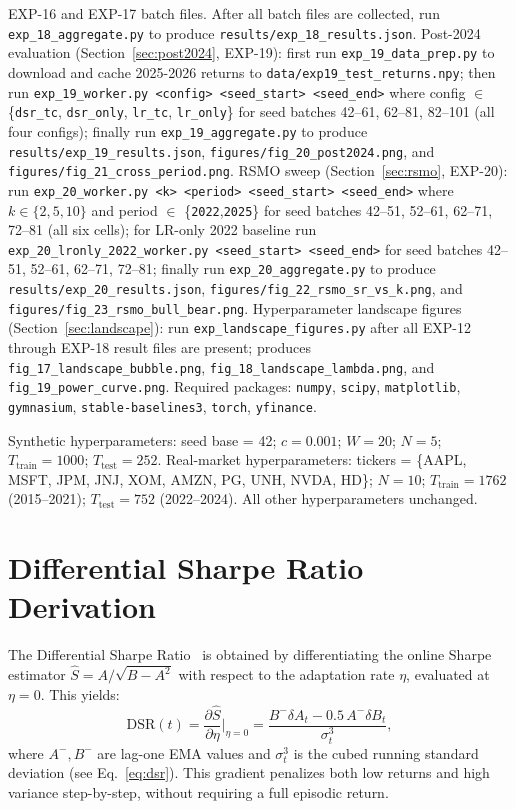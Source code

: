 \documentclass[conference]{IEEEtran}
\begin{document}
EXP-16 and EXP-17 batch files.
After all batch files are collected, run
\texttt{exp\_18\_aggregate.py} to produce
\texttt{results/exp\_18\_results.json}.
Post-2024 evaluation (Section~\ref{sec:post2024}, EXP-19):
first run \texttt{exp\_19\_data\_prep.py} to download and
cache 2025-2026 returns to \texttt{data/exp19\_test\_returns.npy};
then run \texttt{exp\_19\_worker.py <config> <seed\_start> <seed\_end>}
where config $\in$ \{\texttt{dsr\_tc}, \texttt{dsr\_only},
\texttt{lr\_tc}, \texttt{lr\_only}\} for seed batches
42--61, 62--81, 82--101 (all four configs);
finally run \texttt{exp\_19\_aggregate.py} to produce
\texttt{results/exp\_19\_results.json},
\texttt{figures/fig\_20\_post2024.png}, and
\texttt{figures/fig\_21\_cross\_period.png}.
RSMO sweep (Section~\ref{sec:rsmo}, EXP-20):
run \texttt{exp\_20\_worker.py <k> <period> <seed\_start> <seed\_end>}
where $k \in \{2,5,10\}$ and period $\in$ \{\texttt{2022},\texttt{2025}\}
for seed batches 42--51, 52--61, 62--71, 72--81 (all six cells);
for LR-only 2022 baseline run
\texttt{exp\_20\_lronly\_2022\_worker.py <seed\_start> <seed\_end>}
for seed batches 42--51, 52--61, 62--71, 72--81;
finally run \texttt{exp\_20\_aggregate.py} to produce
\texttt{results/exp\_20\_results.json},
\texttt{figures/fig\_22\_rsmo\_sr\_vs\_k.png}, and
\texttt{figures/fig\_23\_rsmo\_bull\_bear.png}.
Hyperparameter landscape figures (Section~\ref{sec:landscape}):
run \texttt{exp\_landscape\_figures.py} after all EXP-12 through
EXP-18 result files are present; produces
\texttt{fig\_17\_landscape\_bubble.png},
\texttt{fig\_18\_landscape\_lambda.png}, and
\texttt{fig\_19\_power\_curve.png}.
Required packages: \texttt{numpy},
\texttt{scipy}, \texttt{matplotlib}, \texttt{gymnasium},
\texttt{stable-baselines3}, \texttt{torch}, \texttt{yfinance}.

Synthetic hyperparameters: seed base = 42; $c = 0.001$; $W = 20$;
$N = 5$; $T_{\mathrm{train}} = 1000$; $T_{\mathrm{test}} = 252$.
Real-market hyperparameters: tickers = \{AAPL, MSFT, JPM, JNJ, XOM,
AMZN, PG, UNH, NVDA, HD\}; $N = 10$; $T_{\mathrm{train}} = 1762$
(2015--2021); $T_{\mathrm{test}} = 752$ (2022--2024). All other
hyperparameters unchanged.

\section{Differential Sharpe Ratio Derivation}

The Differential Sharpe Ratio~\cite{Moody2001} is obtained by differentiating
the online Sharpe estimator $\hat{S} = A/\sqrt{B-A^2}$ with respect to
the adaptation rate $\eta$, evaluated at $\eta=0$. This yields:
\begin{equation}
\mathrm{DSR}(t) = \frac{\partial \hat{S}}{\partial \eta}\bigg|_{\eta=0}
= \frac{B^{-}\delta A_t - 0.5\,A^{-}\delta B_t}{\sigma_t^3},
\end{equation}
where $A^{-},B^{-}$ are lag-one EMA values and $\sigma_t^3$ is the cubed
running standard deviation (see Eq.~\ref{eq:dsr}).
This gradient penalizes both low returns and high variance
step-by-step, without requiring a full episodic return.



\end{document}
